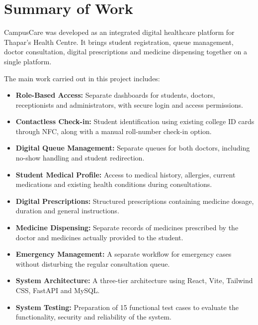 \documentclass[a4paper,oneside,openany]{tietreport}
\begin{document}
\section{Summary of Work}

CampusCare was developed as an integrated digital
healthcare platform for Thapar's Health Centre.
It brings student registration, queue management,
doctor consultation, digital prescriptions and
medicine dispensing together on a single platform.

The main work carried out in this project includes:

\begin{itemize}

    \item \textbf{Role-Based Access:}
    Separate dashboards for students, doctors,
    receptionists and administrators, with secure
    login and access permissions.

    \item \textbf{Contactless Check-in:}
    Student identification using existing college
    ID cards through NFC, along with a manual
    roll-number check-in option.

    \item \textbf{Digital Queue Management:}
    Separate queues for both doctors, including
    no-show handling and student redirection.

    \item \textbf{Student Medical Profile:}
    Access to medical history, allergies, current
    medications and existing health conditions
    during consultations.

    \item \textbf{Digital Prescriptions:}
    Structured prescriptions containing medicine
    dosage, duration and general instructions.

    \item \textbf{Medicine Dispensing:}
    Separate records of medicines prescribed by
    the doctor and medicines actually provided
    to the student.

    \item \textbf{Emergency Management:}
    A separate workflow for emergency cases
    without disturbing the regular consultation
    queue.

    \item \textbf{System Architecture:}
    A three-tier architecture using React, Vite,
    Tailwind CSS, FastAPI and MySQL.

    \item \textbf{System Testing:}
    Preparation of 15 functional test cases to
    evaluate the functionality, security and
    reliability of the system.

\end{itemize}
\end{document}
